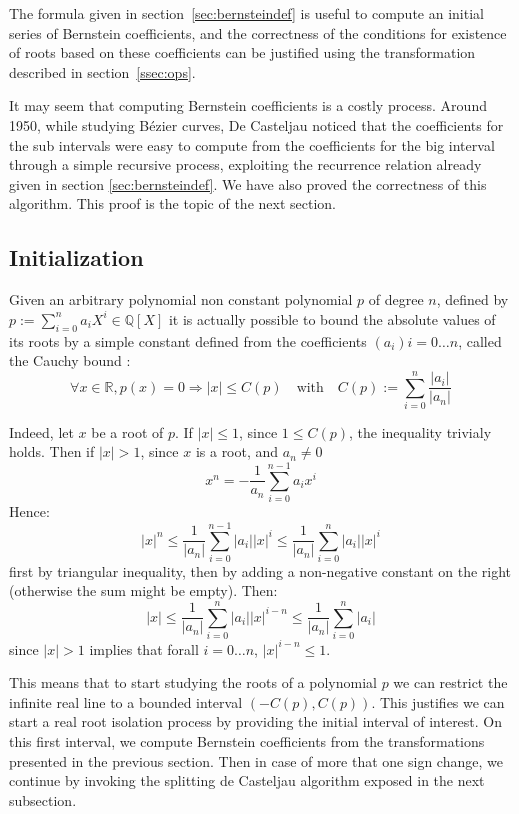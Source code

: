 \documentclass{mscs}
\begin{document}
The formula given in section~\ref{sec:bernsteindef} is useful to compute an
initial series of Bernstein coefficients, and the correctness of the
conditions for existence of roots based on these coefficients can be
justified using the transformation described in
section~\ref{ssec:ops}.

It may seem that computing Bernstein coefficients is a costly process.
Around 1950, while studying B\'ezier curves, De Casteljau noticed that
the coefficients for the sub intervals
were easy to compute from the coefficients for the big interval
through a simple recursive process, exploiting the recurrence relation
already given in section \ref{sec:bernsteindef}. We have also proved the
correctness of this algorithm. This proof is the topic of the next
section.

\subsection{Initialization}\label{ssec:cauchy}
Given an arbitrary polynomial non constant polynomial $p$ of degree
$n$, defined by $p := \sum_{i  = 0}^n a_iX^i \in
\mathbb{Q}[X]$ it is actually  possible to bound the absolute values
of its roots by a simple constant defined from the coefficients
$(a_i){i = 0 \dots n}$, called the Cauchy bound \cite{bpr}:
$$\forall x \in \mathbb{R}, p(x) = 0 \Rightarrow |x|
\leq C(p) \quad \textrm{with} \quad C(p) := \sum_{i=0}^n \frac{|a_i|}{|a_n|}$$

Indeed, let $x$ be a root of $p$. If $|x|\leq 1$, since $1 \leq C(p)$,
the inequality trivialy holds. Then if $|x| > 1$, since $x$ is a root,
and $a_n \neq 0$
$$x^n = - \frac{1}{a_n}\sum_{i = 0}^{n-1}a_i x^i$$
Hence:
$$|x|^n \leq \frac{1}{|a_n|}\sum_{i = 0}^{n-1}|a_i| |x|^i \leq
\frac{1}{|a_n|}\sum_{i = 0}^{n}|a_i| |x|^i$$
first by triangular inequality, then by adding a non-negative constant
on the right (otherwise the sum might be empty). Then:
$$|x| \leq \frac{1}{|a_n|}\sum_{i = 0}^{n}|a_i| |x|^{i - n} \leq
\frac{1}{|a_n|}\sum_{i = 0}^{n}|a_i| $$
since $|x| > 1$ implies that forall $i = 0 \dots n$,
$|x|^{i - n} \leq 1$.

This means that to start studying the roots of a polynomial $p$ we can
restrict the infinite real line to a bounded interval
$(- C(p), C(p))$. This justifies we can start a real root isolation
process by providing the initial interval of interest. On this first
interval, we compute Bernstein coefficients from the transformations
presented in the previous section. Then in case of more that one sign
change, we continue by invoking the splitting de Casteljau algorithm
exposed in the next subsection.
\end{document}
